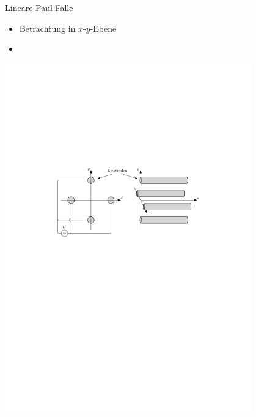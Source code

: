 \documentclass[12pt,xcolor=dvipsnames]{beamer}
\begin{document}
\begin{frame}{Lineare Paul-Falle}
	\begin{itemize}
		\item Betrachtung in $x$-$y$-Ebene
		
		\item 
		
	\end{itemize}
	
	\vspace{0.5cm}
	\centering
	\includegraphics[width=0.8\textwidth]{./figures/lineare_paulfalle_ohne_endkappen.pdf}
\end{frame}
\end{document}
